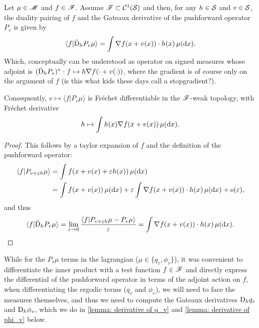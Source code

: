 \documentclass[twoside,10pt]{../jmlr}
\begin{document}
\begin{lemma}\label{lemma: derivative of pushforward operator}
    Let $\mu\in\mathscr{M}$ and $f\in\mathscr{F}$. Assume $\mathscr{F}\subset\mathcal{C}^1(\mathcal{S})$ and then, for any $h\in\mathcal{S}$ and $v\in\mathcal{S}$, the duality pairing of $f$ and the  Gateaux derivative of the pushforward operator $P_v$ is given by
    \begin{align}
        \langle f\vert \bar{\mathrm{D}}_h P_v \mu\rangle=\int \nabla f(x+v(x))\cdot h(x)\,\mu(\mathrm{d} x).
    \end{align}
    Which, conceptually can be understood as operator on signed measures whose adjoint is $(\bar{\mathrm{D}}_h P_v)^*:f \mapsto h\nabla f(\cdot+v(\cdot)) $, where the gradient is of course only on the argument of $f$ (is this what kids these days call a stopgradient?).

    Consequently, $v\mapsto \langle f\vert P_v \mu\rangle$ is Fréchet differentiable in the $\mathscr{F}$-weak topology, with Fréchet derivative
    \begin{align}
        h\mapsto \int h(x)\nabla f(x+v(x))\,\mu(\mathrm{d} x).
    \end{align}
\end{lemma}

\begin{proof}
    This follows by a taylor expansion of $f$ and the definition of the pushforward operator:
    \begin{align}
        \langle f\vert P_{v+\varepsilon h}\mu\rangle&=\int f(x+v(x)+\varepsilon h(x))\,\mu(\mathrm{d} x)\\&=\int f(x+v(x))\,\mu(\mathrm{d} x)+\varepsilon \int \nabla f(x+v(x))\cdot h(x)\,\mu(\mathrm{d} x)+o(\varepsilon),
    \end{align}
    and thus
    \begin{align}
        \langle f\vert \bar{\mathrm{D}}_h P_v \mu\rangle=\lim_{\varepsilon\to 0} \frac{\langle f\vert P_{v+\varepsilon h}\mu-P_v\mu\rangle}{\varepsilon}=\int \nabla f(x+v(x))\cdot h(x)\,\mu(\mathrm{d} x).
    \end{align}
\end{proof}

While for the $P_v\mu$ terms in the lagrangian ($\mu\in\{q_v,\phi_v\}$), it was convenient to differentiate the inner product with a test function $f\in\mathscr{F}$ and directly express the differential of the pushforward operator in terms of the adjoint action on $f$, when differentiating the ergodic terms ($q_v$ and $\phi_v$), we will need to face the measures themselves, and thus we need to compute the Gateaux derivatives $\mathrm{D}_h q_v$ and $\mathrm{D}_h \phi_v$, which we do in \cref{lemma: derivative of q_v} and \cref{lemma: derivative of phi_v} below.
\end{document}
